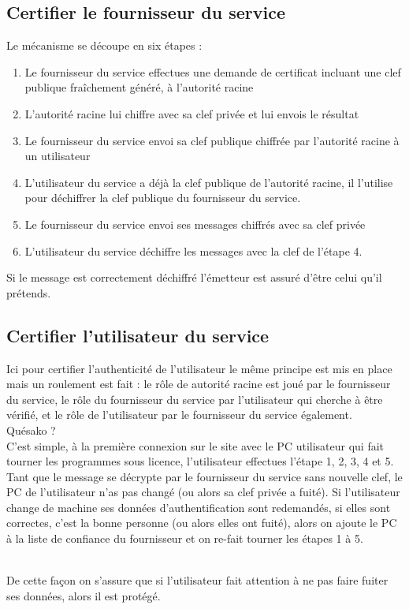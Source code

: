 \documentclass{article}
\begin{document}
\subsection{Certifier le fournisseur du service}

Le mécanisme se découpe en six étapes :
\begin{enumerate}
    \item Le fournisseur du service effectues une demande de certificat incluant une clef publique fraîchement généré, à l'autorité racine
    \item L'autorité racine lui chiffre avec sa clef privée et lui envois le résultat
    \item Le fournisseur du service envoi sa clef publique chiffrée par l'autorité racine à un utilisateur
    \item L'utilisateur du service a déjà la clef publique de l'autorité racine, il l'utilise pour déchiffrer la clef publique du fournisseur du service.
    \item Le fournisseur du service envoi ses messages chiffrés avec sa clef privée
    \item L'utilisateur du service déchiffre les messages avec la clef de l'étape 4.
\end{enumerate}

Si le message est correctement déchiffré l'émetteur est assuré d'être celui qu'il prétends.


\subsection{Certifier l'utilisateur du service}

Ici pour certifier l'authenticité de l'utilisateur le même principe est mis en place mais un roulement est fait : le rôle de autorité racine est joué par le fournisseur du service, le rôle du fournisseur du service par l'utilisateur qui cherche à être vérifié, et le rôle de l'utilisateur par le fournisseur du service également.\\
Quésako ?\\
C'est simple, à la première connexion sur le site avec le PC utilisateur qui fait tourner les programmes sous licence, l'utilisateur effectues l'étape 1, 2, 3, 4 et 5.  Tant que le message se décrypte par le fournisseur du service sans nouvelle clef, le PC de l'utilisateur n'as pas changé (ou alors sa clef privée a fuité). Si l'utilisateur change de machine ses données d'authentification sont redemandés, si elles sont correctes, c'est la bonne personne (ou alors elles ont fuité), alors on ajoute le PC à la liste de confiance du fournisseur et on re-fait tourner les étapes 1 à 5.

\\

De cette façon on s'assure que si l'utilisateur fait attention à ne pas faire fuiter ses données, alors il est protégé.
\end{document}
